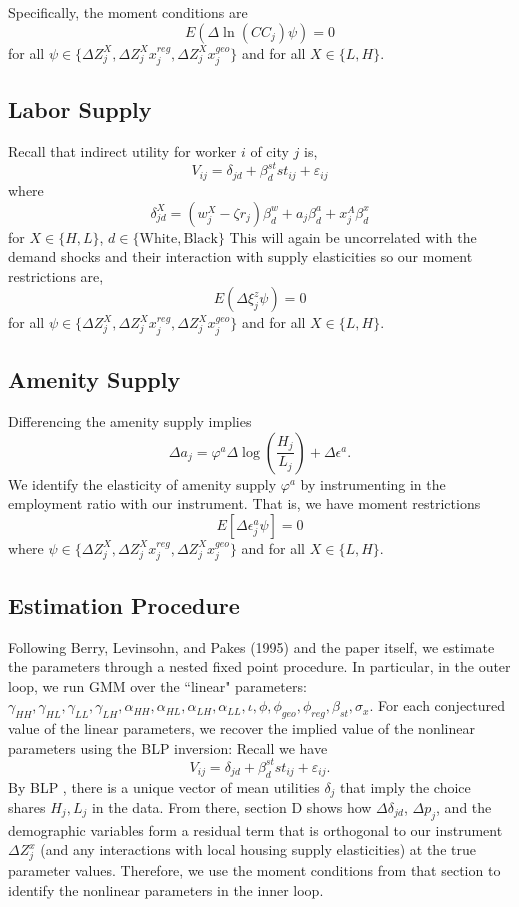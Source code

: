 \documentclass{article}
\begin{document}
Specifically, the moment conditions are 
$$
E(\Delta \ln (CC_{j}) \psi) = 0 
$$
for all $\psi \in \{\Delta Z^X_{j}, \Delta Z_{j}^X x_j^{reg}, \Delta Z_{j}^X x_j^{geo}\}$ and for all $X\in\{L,H\}$.

\subsection{Labor Supply}

Recall that indirect utility for worker $i$ of city $j$ is,
$$V_{ij} = \delta_{jd} + \beta_d^{st}st_{ij}+\varepsilon_{ij}$$
where
$$\delta_{jd}^X = (w^X_{j}-\zeta r_{j})\beta^w_d  + a_{j}\beta^a_d + x_{j}^A\beta^x_d$$
for $X\in\{H,L\}$, $d\in\{\text{White},\text{Black}\}$
This will again be uncorrelated with the demand shocks and their interaction with supply elasticities so our moment restrictions are,
$$
E(\Delta \xi_{j}^z \psi) = 0 
$$
for all $\psi \in \{\Delta Z_{j}^X, \Delta Z_{j}^X x_j^{reg}, \Delta Z_{j}^X x_j^{geo}\}$ and for all $X\in\{L,H\}$.


\subsection{Amenity Supply}
Differencing the amenity supply implies 
$$
\Delta a_{j} = \varphi^a \Delta \log \left(\frac{H_{j}}{L_{j}}\right) + \Delta \epsilon^a.
$$
We identify the elasticity of amenity supply $\varphi^a$ by instrumenting in the employment ratio with our instrument. That is, we have moment restrictions $$
E[\Delta\epsilon^a_{j} \psi] = 0$$
where $\psi \in \{\Delta Z^X_{j}, \Delta Z_{j}^X x_j^{reg}, \Delta Z_{j}^X x_j^{geo}\}$ and for all $X\in\{L,H\}$.

\subsection{Estimation Procedure}

Following Berry, Levinsohn, and Pakes (1995) and the paper itself, we estimate the parameters through a nested fixed point procedure. In particular, in the outer loop, we run GMM over the ``linear" parameters: $\gamma_{HH}, \gamma_{HL}, \gamma_{LL}, \gamma_{LH}, \alpha_{HH}, \alpha_{HL}, \alpha_{LH}, \alpha_{LL},  \iota, \phi, \phi_{geo}, \phi_{reg}, \beta_{st}, \sigma_x$. For each conjectured value of the linear parameters, we recover the implied value of the nonlinear parameters using the BLP inversion:  Recall we have $$V_{ij} = \delta_{jd} + \beta_d^{st}st_{ij} + \varepsilon_{ij}.$$ By BLP , there is a unique vector of mean utilities $\delta_{j}$ that imply the choice shares $H_{j}, L_{j}$ in the data.  From there, section D shows how $\Delta \delta_{jd}$, $\Delta p_{j}$, and the demographic variables form a residual term  that is orthogonal to our instrument $\Delta Z_{j}^x$ (and any interactions with local housing supply elasticities) at the true parameter values. Therefore, we use the moment conditions from that section to identify the nonlinear parameters in the inner loop. 
\end{document}
